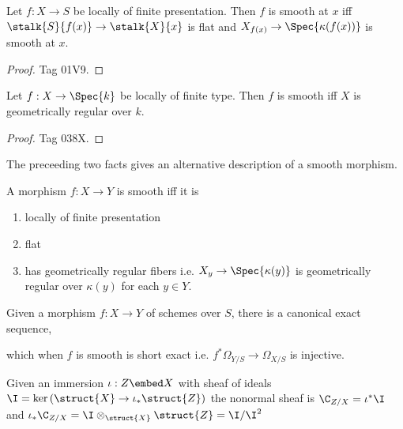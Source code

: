 \documentclass[12pt]{article}
\begin{document}
\begin{lemma}
Let $f : X \to S$ be locally of finite presentation. Then $f$ is smooth at $x$ iff $\stalk{S}{f(x)} \to \stalk{X}{x}$ is flat and $X_{f(x)} \to \Spec{\kappa(f(x))}$ is smooth at $x$.
\end{lemma}

\begin{proof}
Tag 01V9.
\end{proof}

\begin{lemma}
Let $f : X \to \Spec{k}$ be locally of finite type. Then $f$ is smooth iff $X$ is geometrically regular over $k$. 
\end{lemma}

\begin{proof}
Tag 038X.
\end{proof}

\begin{rmk}
The preceeding two facts gives an alternative description of a smooth morphism.
\end{rmk}

\begin{prop}
A morphism $f : X \to Y$ is smooth iff it is
\begin{enumerate}
\item locally of finite presentation
\item flat
\item has geometrically regular fibers i.e. $X_y \to \Spec{\kappa(y)}$ is geometrically regular over $\kappa(y)$ for each $y \in Y$. 
\end{enumerate}
\end{prop}

\begin{prop}
Given a morphism $f : X \to Y$ of schemes over $S$, there is a canonical exact sequence,
\begin{center}
\end{center}
which when $f$ is smooth is short exact i.e. $f^* \Omega_{Y/S} \to \Omega_{X/S}$ is injective.
\end{prop}

\begin{defn}
Given an immersion $\iota : Z \embed X$ with sheaf of ideals $\I = \ker{(\struct{X} \to \iota_* \struct{Z})}$ the nonormal sheaf is $\C_{Z/X} = \iota^* \I$ and $\iota_* \C_{Z/X} = \I \otimes_{\struct{X}} \struct{Z} = \I / \I^2$
\end{defn}
\end{document}
